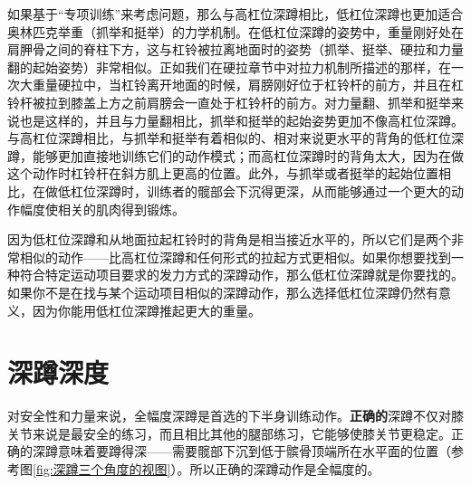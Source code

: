 如果基于“专项训练”来考虑问题，那么与高杠位深蹲相比，低杠位深蹲也更加适合奥林匹克举重（抓举和挺举）的力学机制。在低杠位深蹲的姿势中，重量刚好处在肩胛骨之间的脊柱下方，这与杠铃被拉离地面时的姿势（抓举、挺举、硬拉和力量翻的起始姿势）非常相似。正如我们在硬拉章节中对拉力机制所描述的那样，在一次大重量硬拉中，当杠铃离开地面的时候，肩膀刚好位于杠铃杆的前方，并且在杠铃杆被拉到膝盖上方之前肩膀会一直处于杠铃杆的前方。对力量翻、抓举和挺举来说也是这样的，并且与力量翻相比，抓举和挺举的起始姿势更加不像高杠位深蹲。与高杠位深蹲相比，与抓举和挺举有着相似的、相对来说更水平的背角的低杠位深蹲，能够更加直接地训练它们的动作模式；而高杠位深蹲时的背角太大，因为在做这个动作时杠铃杆在斜方肌上更高的位置。此外，与抓举或者挺举的起始位置相比，在做低杠位深蹲时，训练者的髋部会下沉得更深，从而能够通过一个更大的动作幅度使相关的肌肉得到锻炼。

因为低杠位深蹲和从地面拉起杠铃时的背角是相当接近水平的，所以它们是两个非常相似的动作——比高杠位深蹲和任何形式的拉起方式更相似。如果你想要找到一种符合特定运动项目要求的发力方式的深蹲动作，那么低杠位深蹲就是你要找的。如果你不是在找与某个运动项目相似的深蹲动作，那么选择低杠位深蹲仍然有意义，因为你能用低杠位深蹲推起更大的重量。

\section{深蹲深度}

对安全性和力量来说，全幅度深蹲是首选的下半身训练动作。\textbf{正确的}深蹲不仅对膝关节来说是最安全的练习，而且相比其他的腿部练习，它能够使膝关节更稳定。正确的深蹲意味着要蹲得深——需要髋部下沉到低于髌骨顶端所在水平面的位置（参考图\ref{fig:深蹲三个角度的视图}）。所以正确的深蹲动作是全幅度的。
